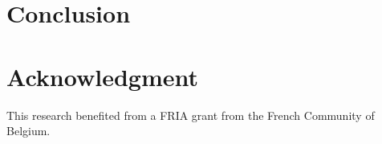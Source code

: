 \documentclass{ISMA_USD2020}
\begin{document}
\section{Conclusion}
\label{sec:orgf8a3da6}
\label{sec:conclusion}

\section*{Acknowledgment}
\label{sec:orgee9adb1}
This research benefited from a FRIA grant from the French Community of Belgium.


\end{document}
